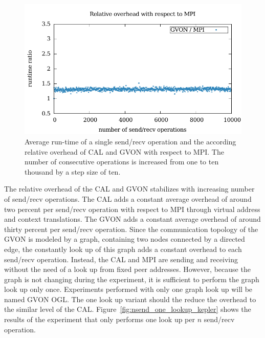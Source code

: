 \begin{figure}[H]
\begin{minipage}[t]{0.5\textwidth}
    \includegraphics[width=\textwidth]{plots/50_nsend_overhead_gvon}
  \end{minipage}%
  \caption{Average run-time of a single send/recv operation and the
    according relative overhead of CAL and GVON with respect to
    MPI. The number of consecutive operations is increased from one to
    ten thousand by a step size of ten. }
  \label{fig:nsend_kepler}
\end{figure}

\noindent The relative overhead of the CAL and GVON stabilizes with
increasing number of send/recv operations.  The CAL adds a constant
average overhead of around two percent per send/recv operation with
respect to MPI through virtual address and context translations. The
GVON adds a constant average overhead of around thirty percent per
send/recv operation.  Since the communication topology of the GVON is
modeled by a graph, containing two nodes connected by a directed edge,
the constantly look up of this graph adds a constant overhead to each
send/recv operation.  Instead, the CAL and MPI are sending and
receiving without the need of a look up from fixed peer addresses.
However, because the graph is not changing during the experiment, it
is sufficient to perform the graph look up only once. Experiments
performed with only one graph look up will be named GVON OGL. The one
look up variant should the reduce the overhead to the similar level of
the CAL. Figure~\ref{fig:nsend_one_lookup_kepler} shows the results of
the experiment that only performs one look up per $n$ send/recv
operation.

